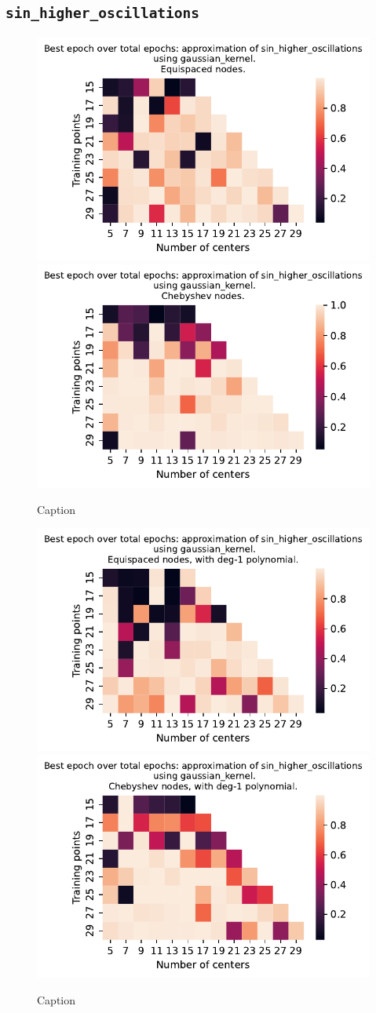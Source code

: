 \documentclass[12pt]{report} %
\begin{document}
\clearpage
\subsection*{\texttt{sin\_higher\_oscillations}}

\begin{figure}[ht]
  \centering

  \includegraphics[width=.49\textwidth]{imagenes/experiments/1d/variational_epochs/sin_higher_oscillations-Kgaussian_kernel-Equi-epochs.pdf}
  \includegraphics[width=.49\textwidth]{imagenes/experiments/1d/variational_epochs/sin_higher_oscillations-Kgaussian_kernel-Cheb-epochs.pdf}
  \caption{Caption}
  \label{fig:epochs-sin-higher-oscillations-gaussian}
\end{figure}

\begin{figure}[ht]
  \centering

  \includegraphics[width=.49\textwidth]{imagenes/experiments/1d/variational_epochs/sin_higher_oscillations-Kgaussian_kernel-Poly-Equi-epochs.pdf}
  \includegraphics[width=.49\textwidth]{imagenes/experiments/1d/variational_epochs/sin_higher_oscillations-Kgaussian_kernel-Poly-Cheb-epochs.pdf}
  \caption{Caption}
  \label{fig:epochs-sin-higher-oscillations-gaussian-poly}
\end{figure}
\end{document}
